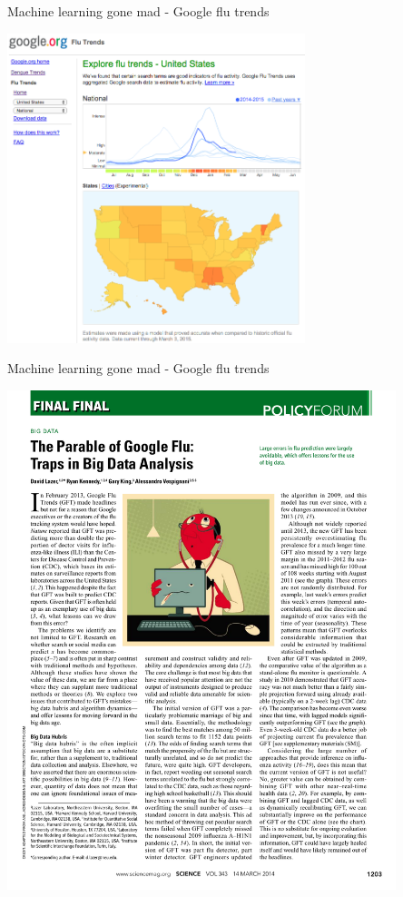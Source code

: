 \documentclass[pdf]{beamer}
\begin{document}
\begin{frame}{Machine learning gone mad - Google flu trends}
\begin{center}
		\includegraphics[width=0.65\textwidth]{googleFluTrend1.png}
\end{center}
\end{frame}
\begin{frame}{Machine learning gone mad - Google flu trends}
\begin{center}
		\includegraphics[width=0.85\textwidth]{googleFluTrend2.pdf}
\end{center}
\end{frame}
\end{document}
